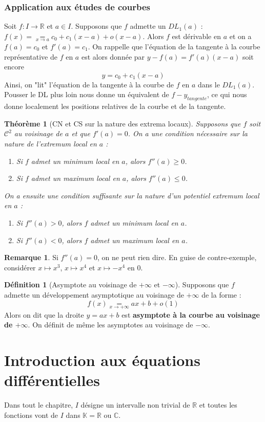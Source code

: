 \documentclass[french]{book}
\newcommand{\R}{\mathbb{R}}
\newcommand{\C}{\mathbb{C}}
\newcommand{\K}{\mathbb{K}}
\theoremstyle{plain}
\newtheorem{thm}{Théorème}[chapter]
\theoremstyle{definition}
\newtheorem{dfn}{Définition}[chapter]
\newtheorem{rmq}{Remarque}[chapter]
\theoremstyle{remark}
\begin{document}
\subsection{Application aux études de courbes}
Soit $f:I\rightarrow\R$ et $a\in I$. Supposons que $f$ admette un $DL_1(a)$ : $f(x)=\underset{x\to a}{=}c_0+c_1(x-a)+o(x-a)$. Alors $f$ est dérivable en $a$ et on a $f(a)=c_0$ et $f'(a)=c_1$. On rappelle que l'équation de la tangente à la courbe représentative de $f$ en $a$ est alors donnée par $y-f(a)=f'(a)(x-a)$ soit encore $$y=c_0+c_1(x-a)$$ Ainsi, on "lit" l'équation de la tangente à la courbe de $f$ en $a$ dans le $DL_1(a)$. Pousser le DL plus loin nous donne un équivalent de $f-y_{tangente}$, ce qui nous donne localement les positions relatives de la courbe et de la tangente.
\begin{thm}[CN et CS sur la nature des extrema locaux]
	Supposons que $f$ soit $\mathcal{C}^2$ au voisinage de $a$ et que $f'(a)=0$. On a une condition nécessaire sur la nature de l'extremum local en $a$ :
	\begin{enumerate}
		\item Si $f$ admet un minimum local en $a$, alors $f''(a)\geqslant0$.
		\item Si $f$ admet un maximum local en $a$, alors $f''(a)\leqslant0$.
	\end{enumerate}
	On a ensuite une condition suffisante sur la nature d'un potentiel extremum local en $a$ :
	\begin{enumerate}
		\item Si $f''(a)>0$, alors $f$ admet un minimum local en $a$.
		\item Si $f''(a)<0$, alors $f$ admet un maximum local en $a$.
	\end{enumerate}
\end{thm}
\begin{rmq}
	Si $f''(a)=0$, on ne peut rien dire. En guise de contre-exemple, considérer $x\mapsto x^3$, $x\mapsto x^4$ et $x\mapsto -x^4$ en $0$.
\end{rmq}
\begin{dfn}[Asymptote au voisinage de $+\infty$ et $-\infty$]
	Supposons que $f$ admette un développement asymptotique au voisinage de $+\infty$ de la forme : $$f(x)\underset{x\to+\infty}{=}ax+b+o(1)$$ Alors on dit que la droite $y=ax+b$ est \textbf{asymptote à la courbe au voisinage de $+\infty$}. On définit de même les asymptotes au voisinage de $-\infty$.
\end{dfn}
\newpage
\chapter{Introduction aux équations différentielles}
Dans tout le chapitre, $I$ désigne un intervalle non trivial de $\R$ et toutes les fonctions vont de $I$ dans $\K=\R$ ou $\C$.
\end{document}
